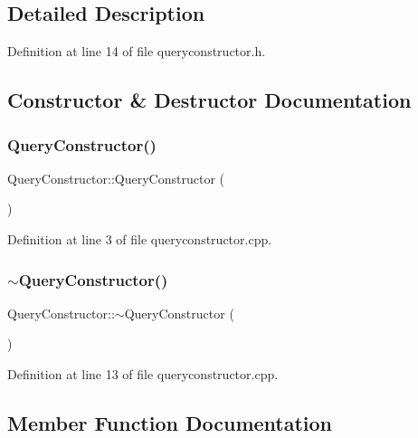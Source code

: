 \subsection{Detailed Description}


Definition at line 14 of file queryconstructor.\+h.



\subsection{Constructor \& Destructor Documentation}
\hypertarget{classQueryConstructor_aca25dd3b5f90ea47d12603839f9e5fa1}{}\label{classQueryConstructor_aca25dd3b5f90ea47d12603839f9e5fa1} 
\subsubsection{\texorpdfstring{Query\+Constructor()}{QueryConstructor()}}
{\footnotesize\ttfamily Query\+Constructor\+::\+Query\+Constructor (\begin{DoxyParamCaption}{ }\end{DoxyParamCaption})}



Definition at line 3 of file queryconstructor.\+cpp.

\hypertarget{classQueryConstructor_a36ee5259fb3d02aed7001969280d1f41}{}\label{classQueryConstructor_a36ee5259fb3d02aed7001969280d1f41} 
\subsubsection{\texorpdfstring{$\sim$\+Query\+Constructor()}{~QueryConstructor()}}
{\footnotesize\ttfamily Query\+Constructor\+::$\sim$\+Query\+Constructor (\begin{DoxyParamCaption}{ }\end{DoxyParamCaption})}



Definition at line 13 of file queryconstructor.\+cpp.



\subsection{Member Function Documentation}
\hypertarget{classQueryConstructor_ab184e96ccdb30c0d6bedd904b6614e12}{}\label{classQueryConstructor_ab184e96ccdb30c0d6bedd904b6614e12} 
